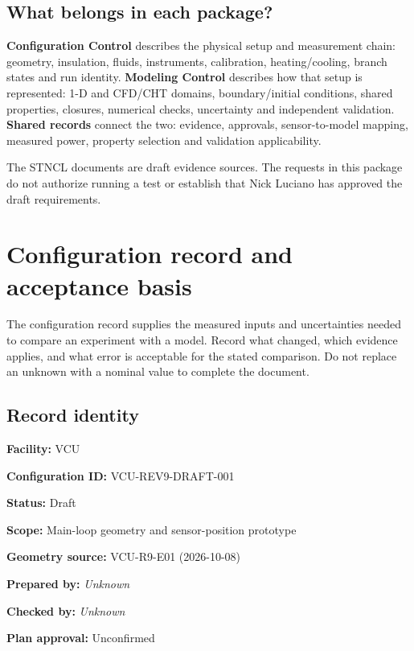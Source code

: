 \documentclass[11pt]{article}
\newcommand{\notebox}[1]{\par\noindent\colorbox{amber}{\parbox{\dimexpr\linewidth-2\fboxsep\relax}{#1}}\par}
\begin{document}
\subsection*{What belongs in each package?}
\textbf{Configuration Control} describes the physical setup and measurement chain: geometry, insulation, fluids, instruments, calibration, heating/cooling, branch states and run identity.
\textbf{Modeling Control} describes how that setup is represented: 1-D and CFD/CHT domains, boundary/initial conditions, shared properties, closures, numerical checks, uncertainty and independent validation.
\textbf{Shared records} connect the two: evidence, approvals, sensor-to-model mapping, measured power, property selection and validation applicability.
\notebox{The STNCL documents are draft evidence sources. The requests in this package do not authorize running a test or establish that Nick Luciano has approved the draft requirements.}
\clearpage\tableofcontents
\clearpage\section{Configuration record and acceptance basis}\label{configuration-record}
\begingroup\small
The configuration record supplies the measured inputs and uncertainties needed to compare an experiment with a model. Record what changed, which evidence applies, and what error is acceptable for the stated comparison. Do not replace an unknown with a nominal value to complete the document.
\subsection*{Record identity}
\textbf{Facility:} VCU\par
\textbf{Configuration ID:} VCU-REV9-DRAFT-001\par
\textbf{Status:} Draft\par
\textbf{Scope:} Main-loop geometry and sensor-position prototype\par
\textbf{Geometry source:} VCU-R9-E01 (2026-10-08)\par
\textbf{Prepared by:} \textit{Unknown}\par
\textbf{Checked by:} \textit{Unknown}\par
\textbf{Plan approval:} Unconfirmed\par
\end{document}
